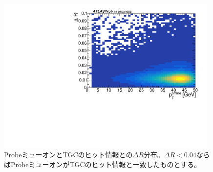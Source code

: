 \begin{figure}[htb]
  \centering
  \includegraphics[clip, width=11cm]{fig/5/dR_probe_RoI.pdf}
  \caption{ProbeミューオンとTGCのヒット情報との$\Delta R$分布。$\Delta R< 0.04$ならばProbeミューオンがTGCのヒット情報と一致したものとする。}
  \label{fig:Probe_TGC}
\end{figure}

